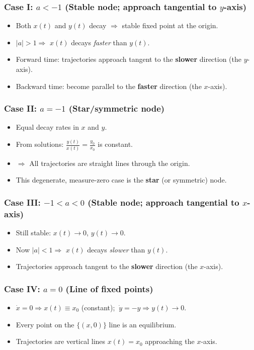 \documentclass{beamer}
\begin{document}
\begin{frame}
  \frametitle{Case I: $a<-1$ (Stable node; approach tangential to $y$-axis)}
  \begin{itemize}
    \item Both \(x(t)\) and \(y(t)\) decay \(\Rightarrow\) stable fixed point at the origin.
    \item \( |a|>1 \Rightarrow\) \(x(t)\) decays \emph{faster} than \(y(t)\).
    \item Forward time: trajectories approach tangent to the \textbf{slower} direction (the \(y\)-axis).
    \item Backward time: become parallel to the \textbf{faster} direction (the \(x\)-axis).
  \end{itemize}
\end{frame}


\begin{frame}
  \frametitle{Case II: $a=-1$ (Star/symmetric node)}
  \begin{itemize}
    \item Equal decay rates in \(x\) and \(y\).
    \item From solutions: \(\displaystyle \frac{y(t)}{x(t)}=\frac{y_0}{x_0}\) is constant.
    \item \(\Rightarrow\) All trajectories are straight lines through the origin.
    \item This degenerate, measure-zero case is the \textbf{star} (or symmetric) node.
  \end{itemize}
\end{frame}


\begin{frame}
  \frametitle{Case III: $-1<a<0$ (Stable node; approach tangential to $x$-axis)}
  \begin{itemize}
    \item Still stable: \(x(t)\to 0\), \(y(t)\to 0\).
    \item Now \(|a|<1 \Rightarrow\) \(x(t)\) decays \emph{slower} than \(y(t)\).
    \item Trajectories approach tangent to the \textbf{slower} direction (the \(x\)-axis).
  \end{itemize}
\end{frame}


\begin{frame}
  \frametitle{Case IV: $a=0$ (Line of fixed points)}
  \begin{itemize}
    \item \(\dot x = 0 \Rightarrow x(t)\equiv x_0\) (constant); \(\ \dot y=-y\Rightarrow y(t)\to 0.\)
    \item Every point on the \(\{(x,0)\}\) line is an equilibrium.
    \item Trajectories are vertical lines \(x(t)=x_0\) approaching the \(x\)-axis.
  \end{itemize}
\end{frame}
\end{document}
